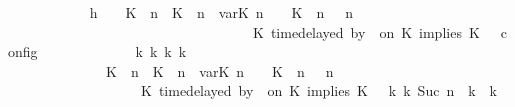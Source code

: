 \begin{isabellebody}
\ \ \ \ \ \ \ \ \ \ \isamarkupfalse%
\ h{}{\isacharcolon}\ {\isacartoucheopen}{\isasymrho}\ {\isasymin}\ {\isasymlbrakk}\ {\isacharparenleft}{\isacharparenleft}K\ {\isasymUp}\ n{\isacharparenright}\ {\isacharhash}\ {\isacharparenleft}K\ {\isasymDown}\ n\ {\isacharat}{\isasymsharp}\ {\isasymlparr}{\isasymtau}\isactrlsub v\isactrlsub a\isactrlsub r{\isacharparenleft}K\ n{\isacharparenright}\ {\isasymoplus}\ {\isasymdelta}{\isasymtau}{\isasymrparr}{\isacharparenright}\ {\isacharhash}\ {\isacharparenleft}K\ {\isasymUp}\ n{\isacharparenright}\ {\isacharhash}\ {\isasymGamma}{\isacharparenright}{\isacharcomma}\ n\isanewline
\ \ \ \ \ \ \ \ \ \ \ \ \ \ \ \ \ \ \ \ \ \ \ \ \ \ \ \ \ \ \ \ {\isasymturnstile}\ {\isasymPsi}\ {\isasymtriangleright}\ {\isacharparenleft}{\isacharparenleft}K\ time{\isacharminus}delayed{\isasymsharp}\ by\ {\isasymdelta}{\isasymtau}\ on\ K\ implies\ K\ {\isacharhash}\ {\isasymPhi}{\isacharparenright}\ {\isasymrbrakk}\isactrlsub c\isactrlsub o\isactrlsub n\isactrlsub f\isactrlsub i\isactrlsub g{\isacartoucheclose}\isanewline
\ \ \ \ \ \ \ \ \ \ \isamarkupfalse%
\ \isamarkupfalse%
\ {\isacartoucheopen}{\isasymexists}{\isasymGamma}\isactrlsub k\ {\isasymPsi}\isactrlsub k\ {\isasymPhi}\isactrlsub k\ k{\isachardot}\isanewline
\ \ \ \ \ \ \ \ \ \ \ \ \ \ {\isacharparenleft}{\isacharparenleft}{\isacharparenleft}{\isacharparenleft}K\ {\isasymUp}\ n{\isacharparenright}\ {\isacharhash}\ {\isacharparenleft}K\ {\isasymDown}\ n\ {\isacharat}{\isasymsharp}\ {\isasymlparr}{\isasymtau}\isactrlsub v\isactrlsub a\isactrlsub r{\isacharparenleft}K\ n{\isacharparenright}\ {\isasymoplus}\ {\isasymdelta}{\isasymtau}{\isasymrparr}{\isacharparenright}\ {\isacharhash}\ {\isacharparenleft}K\ {\isasymUp}\ n{\isacharparenright}\ {\isacharhash}\ {\isasymGamma}{\isacharparenright}{\isacharcomma}\ n\isanewline
\ \ \ \ \ \ \ \ \ \ \ \ \ \ \ \ {\isasymturnstile}\ {\isasymPsi}\ {\isasymtriangleright}\ {\isacharparenleft}{\isacharparenleft}K\ time{\isacharminus}delayed{\isasymsharp}\ by\ {\isasymdelta}{\isasymtau}\ on\ K\ implies\ K\ {\isacharhash}\ {\isasymPhi}{\isacharparenright}{\isacharparenright}\ {\isasymhookrightarrow}\isactrlbsup k\isactrlesup \ {\isacharparenleft}{\isasymGamma}\isactrlsub k{\isacharcomma}\ Suc\ n\ {\isasymturnstile}\ {\isasymPsi}\isactrlsub k\ {\isasymtriangleright}\ {\isasymPhi}\isactrlsub k{\isacharparenright}{\isacharparenright}\isanewline

\end{isabellebody}
